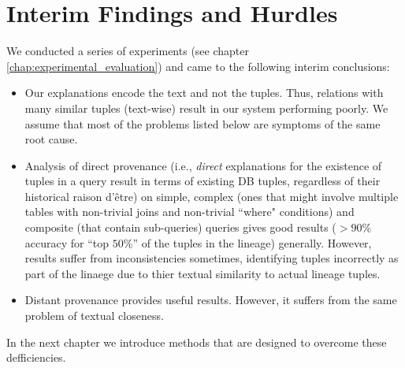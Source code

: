 \section{Interim Findings and Hurdles}
We conducted a series of experiments (see chapter \ref{chap:experimental_evaluation}) and came to the following interim conclusions:
\begin{itemize}
    \item Our explanations encode the text and not the tuples. Thus, relations with many similar tuples (text-wise) result in our system performing poorly. We assume that most of the problems listed below are symptoms of the same root cause.
    \item Analysis of direct provenance (i.e., \textit{direct} explanations for the existence of tuples in a query result in terms of existing DB tuples, regardless of their historical raison d'être) on simple, complex (ones that might involve multiple tables with non-trivial joins and non-trivial ``where" conditions) and composite (that contain sub-queries) queries gives good results ($> 90\%$ accuracy for ``top $50\%$'' of the tuples in the lineage) generally. However, results suffer from inconsistencies sometimes, identifying tuples incorrectly as part of the linaege due to thier textual similarity to actual lineage tuples.
    \item Distant provenance provides useful results. However, it suffers from the same problem of textual closeness.
\end{itemize}

\par In the next chapter we introduce methods that are designed to overcome these defficiencies.

